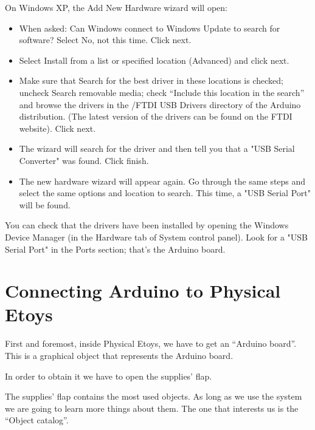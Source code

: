 \documentclass[english]{etoys-guide}
\begin{document}
On Windows XP, the Add New Hardware wizard will open:

\begin{itemize}
	
	\item When asked: Can Windows connect to Windows Update to search for
	software? Select No, not this time. Click next.

	\item Select Install from a list or specified location (Advanced) and click
	next.

	\item Make sure that Search for the best driver in these locations is
	checked; uncheck Search removable media; check “Include this location in
	the search” and browse the drivers in the /FTDI USB Drivers directory of
	the Arduino distribution. (The latest version of the drivers can be found
	on the FTDI website). Click next.

	\item The wizard will search for the driver and then tell you that a "USB
	Serial Converter" was found. Click finish.

	\item The new hardware wizard will appear again. Go through the same steps
	and select the same options and location to search. This time, a "USB
	Serial Port" will be found.

\end{itemize}

You can check that the drivers have been installed by opening the Windows
Device Manager (in the Hardware tab of System control panel). Look for a "USB
Serial Port" in the Ports section; that's the Arduino board.


\section{Connecting Arduino to Physical Etoys}

First and foremost, inside Physical Etoys, we have to get an “Arduino board”.
This is a graphical object that represents the Arduino board. 

In order to obtain it we have to open the supplies’ flap.


The supplies’ flap contains the most used objects.  As long as we use the
system we are going to learn more things about them. The one that interests us
is the “Object catalog”.
\end{document}
